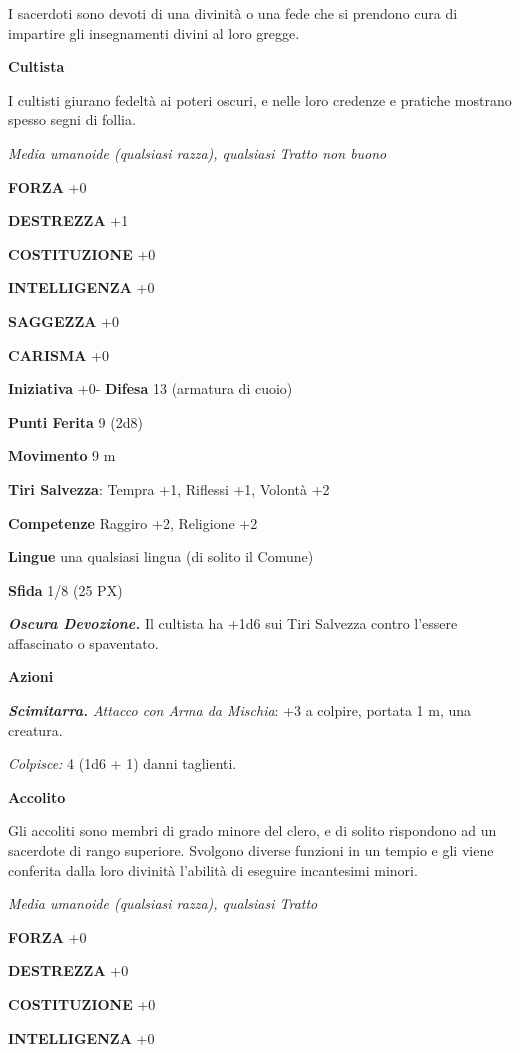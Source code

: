 \begin{multicols}{2}
I sacerdoti sono devoti di una divinità o una fede che si prendono cura di impartire gli insegnamenti divini al loro gregge.

\medskip\textbf{Cultista}

I cultisti giurano fedeltà ai poteri oscuri, e nelle loro credenze e pratiche mostrano spesso segni di follia.

\textit{Media umanoide (qualsiasi razza), qualsiasi Tratto non buono}

\textbf{FORZA} +0

\textbf{DESTREZZA} +1

\textbf{COSTITUZIONE} +0

\textbf{INTELLIGENZA} +0

\textbf{SAGGEZZA} +0

\textbf{CARISMA} +0

\textbf{Iniziativa} +0- \textbf{Difesa} 13 (armatura di cuoio)

\textbf{Punti Ferita} 9 (2d8)

\textbf{Movimento} 9 m

\textbf{Tiri Salvezza}: Tempra +1, Riflessi +1, Volontà +2

\textbf{Competenze} Raggiro +2, Religione +2

\textbf{Lingue} una qualsiasi lingua (di solito il Comune)

\textbf{Sfida} 1/8 (25 PX)

\textit{\textbf{Oscura Devozione.}} Il cultista ha +1d6 sui Tiri Salvezza contro l'essere affascinato o spaventato.

\textbf{Azioni}

\textit{\textbf{Scimitarra.} Attacco con Arma da Mischia}: +3 a colpire, portata 1 m, una creatura.

\textit{Colpisce:} 4 (1d6 + 1) danni taglienti.

\medskip\textbf{Accolito}

Gli accoliti sono membri di grado minore del clero, e di solito rispondono ad un sacerdote di rango superiore. Svolgono diverse funzioni in un tempio e gli viene conferita dalla loro divinità l'abilità di eseguire incantesimi minori.

\textit{Media umanoide (qualsiasi razza), qualsiasi Tratto}

\textbf{FORZA} +0

\textbf{DESTREZZA} +0

\textbf{COSTITUZIONE} +0

\textbf{INTELLIGENZA} +0


\end{multicols}
